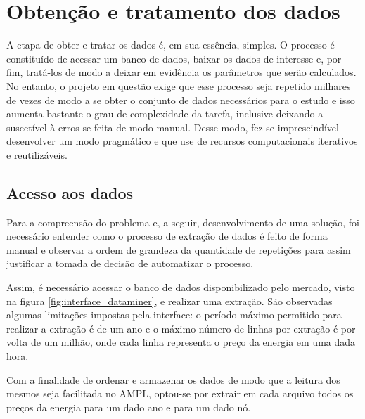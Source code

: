 \section{Obtenção e tratamento dos dados}
A etapa de obter e tratar os dados é, em sua essência, simples. O processo é constituído de acessar um banco de dados, baixar os dados de interesse e, por fim, tratá-los de modo a deixar em evidência os parâmetros que serão calculados. No entanto, o projeto em questão exige que esse processo seja repetido milhares de vezes de modo a se obter o conjunto de dados necessários para o estudo e isso aumenta bastante o grau de complexidade da tarefa, inclusive deixando-a suscetível à erros se feita de modo manual. Desse modo, fez-se imprescindível desenvolver um modo pragmático e que use de recursos computacionais iterativos e reutilizáveis.

\subsection{Acesso aos dados}
Para a compreensão do problema e, a seguir, desenvolvimento de uma solução, foi necessário entender como o processo de extração de dados é feito de forma manual e observar a ordem de grandeza da quantidade de repetições para assim justificar a tomada de decisão de automatizar o processo.

Assim, é necessário acessar o \href{https://dataminer2.pjm.com}{banco de dados} disponibilizado pelo mercado, visto na figura \ref{fig:interface_dataminer}, e realizar uma extração. São observadas algumas limitações impostas pela interface: o período máximo permitido para realizar a extração é de um ano e o máximo número de linhas por extração é por volta de um milhão, onde cada linha representa o preço da energia em uma dada hora. 

Com a finalidade de ordenar e armazenar os dados de modo que a leitura dos mesmos seja facilitada no AMPL, optou-se por extrair em cada arquivo todos os preços da energia para um dado ano e para um dado nó. 

